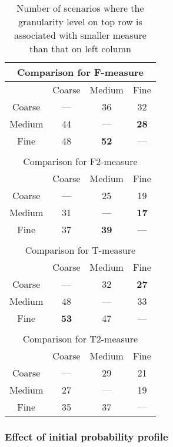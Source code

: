 \documentclass[10pt,journal,compsoc]{IEEEtran}
\begin{document}
\begin{table}
\caption{Number of scenarios where the granularity level on top row is associated with smaller measure than that on left column}
\label{tab:Gsta}
\centering
\begin{tabular}{|c|c|c|c|}
\multicolumn{4}{c}{Comparison for F-measure} \\ \hline
		& Coarse			& Medium			    & Fine				\\ \hline
Coarse	& ---				& 36					& 32				\\ \hline
Medium	& 44				& ---					& \textbf{28}	    \\ \hline
Fine	& 48			    & \textbf{52}	        & ---				\\ \hline
\multicolumn{4}{c}{ } \\
\multicolumn{4}{c}{Comparison for F2-measure} \\ \hline
				& Coarse			& Medium			& Fine				    \\ \hline
Coarse	& ---					& 25					& 19					\\ \hline
Medium	& 31					& ---					& \textbf{17}	        \\ \hline
Fine	& 37					& \textbf{39}	        & ---					\\ \hline
\multicolumn{4}{c}{ } \\
\multicolumn{4}{c}{Comparison for T-measure} \\ \hline
		& Coarse			& Medium			& Fine				  \\ \hline
Coarse	& ---				& 32				& \textbf{27}	      \\ \hline
Medium	& 48				& ---				& 33					\\ \hline
Fine		& \textbf{53}	& 47				& ---					\\ \hline
\multicolumn{4}{c}{ } \\
\multicolumn{4}{c}{Comparison for T2-measure} \\ \hline
				& Coarse			& Medium			& Fine				\\ \hline
Coarse	& ---					& 29					& 21					\\ \hline
Medium	& 27					& ---					& 19					\\ \hline
Fine		& 35					& 37					& ---					\\ \hline
\end{tabular}
\end{table}

\subsubsection{Effect of initial probability profile}
\end{document}
